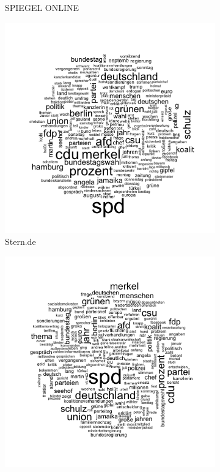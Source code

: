 \documentclass[12pt,a4paper,notitlepage]{article}
\begin{document}
\begin{figure}[H]
\begin{center}
\begin{subfigure}[normla]{0.3\textwidth}
			\caption{SPIEGEL ONLINE}
		\end{subfigure}
		\begin{subfigure}[normla]{0.3\textwidth}
			\includegraphics[width=\textwidth]{../figs/wordcloud_stern.png}
			\caption{Stern.de}
		\end{subfigure}
		\begin{subfigure}[normla]{0.3\textwidth}
			\includegraphics[width=\textwidth]{../figs/wordcloud_Tagesschau.png}

\end{subfigure}
\end{center}
\end{figure}
\end{document}
